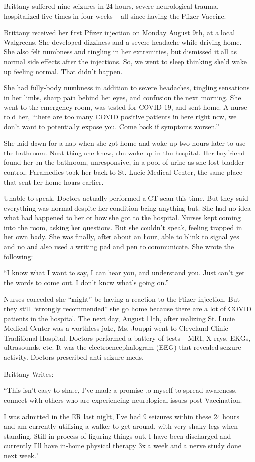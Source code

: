 Brittany suffered nine seizures in 24 hours, severe neurological trauma,
hospitalized five times in four weeks – all since having the Pfizer Vaccine.

Brittany received her first Pfizer injection on Monday August 9th, at a local
Walgreens. She developed dizziness and a severe headache while driving home. She
also felt numbness and tingling in her extremities, but dismissed it all as
normal side effects after the injections. So, we went to sleep thinking she’d
wake up feeling normal. That didn’t happen.

She had fully-body numbness in addition to severe headaches, tingling sensations
in her limbs, sharp pain behind her eyes, and confusion the next morning. She
went to the emergency room, was tested for COVID-19, and sent home. A nurse told
her, “there are too many COVID positive patients in here right now, we don’t
want to potentially expose you. Come back if symptoms worsen.”

She laid down for a nap when she got home and woke up two hours later to use the
bathroom. Next thing she knew, she woke up in the hospital. Her boyfriend found
her on the bathroom, unresponsive, in a pool of urine as she lost bladder
control. Paramedics took her back to St. Lucie Medical Center, the same place
that sent her home hours earlier.

Unable to speak, Doctors actually performed a CT scan this time. But they said
everything was normal despite her condition being anything but. She had no idea
what had happened to her or how she got to the hospital. Nurses kept coming into
the room, asking her questions. But she couldn’t speak, feeling trapped in her
own body. She was finally, after about an hour, able to blink to signal yes and
no and also used a writing pad and pen to communicate. She wrote the following:

“I know what I want to say, I can hear you, and understand you. Just can’t get
the words to come out. I don’t know what’s going on.”

Nurses conceded she “might” be having a reaction to the Pfizer injection. But
they still “strongly recommended” she go home because there are a lot of COVID
patients in the hospital. The next day, August 11th, after realizing St. Lucie
Medical Center was a worthless joke, Ms. Jouppi went to Cleveland Clinic
Traditional Hospital. Doctors performed a battery of tests – MRI, X-rays, EKGs,
ultrasounds, etc. It was the electroencephalogram (EEG) that revealed seizure
activity. Doctors prescribed anti-seizure meds.

Brittany Writes:

“This isn’t easy to share, I’ve made a promise to myself to spread awareness,
connect with others who are experiencing neurological issues post Vaccination.

I was admitted in the ER last night, I’ve had 9 seizures within these 24 hours
and am currently utilizing a walker to get around, with very shaky legs when
standing. Still in process of figuring things out. I have been discharged and
currently I’ll have in-home physical therapy 3x a week and a nerve study done
next week.”


